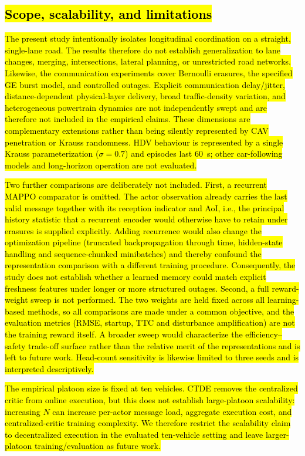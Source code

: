 \documentclass{ieeeaccess}
\begin{document}
\subsection{\hl{Scope, scalability, and limitations}}
\label{sec:limitations}

\hl{The present study intentionally isolates longitudinal coordination on a straight, single-lane road. The results therefore do not establish generalization to lane changes, merging, intersections, lateral planning, or unrestricted road networks. Likewise, the communication experiments cover Bernoulli erasures, the specified GE burst model, and controlled outages. Explicit communication delay/jitter, distance-dependent physical-layer delivery, broad traffic-density variation, and heterogeneous powertrain dynamics are not independently swept and are therefore not included in the empirical claims. These dimensions are complementary extensions rather than being silently represented by CAV penetration or Krauss randomness. HDV behaviour is represented by a single Krauss parameterization ($\sigma=0.7$) and episodes last 60~s; other car-following models and long-horizon operation are not evaluated.}

\hl{Two further comparisons are deliberately not included. First, a recurrent MAPPO comparator is omitted. The actor observation already carries the last valid message together with its reception indicator and AoI, i.e., the principal history statistic that a recurrent encoder would otherwise have to retain under erasures is supplied explicitly. Adding recurrence would also change the optimization pipeline (truncated backpropagation through time, hidden-state handling and sequence-chunked minibatches) and thereby confound the representation comparison with a different training procedure. Consequently, the study does not establish whether a learned memory could match explicit freshness features under longer or more structured outages. Second, a full reward-weight sweep is not performed. The two weights are held fixed across all learning-based methods, so all comparisons are made under a common objective, and the evaluation metrics (RMSE, startup, TTC and disturbance amplification) are not the training reward itself. A broader sweep would characterize the efficiency--safety trade-off surface rather than the relative merit of the representations and is left to future work. Head-count sensitivity is likewise limited to three seeds and is interpreted descriptively.}

\hl{The empirical platoon size is fixed at ten vehicles. CTDE removes the centralized critic from online execution, but this does not establish large-platoon scalability: increasing $N$ can increase per-actor message load, aggregate execution cost, and centralized-critic training complexity. We therefore restrict the scalability claim to decentralized execution in the evaluated ten-vehicle setting and leave larger-platoon training/evaluation as future work.}
\end{document}
